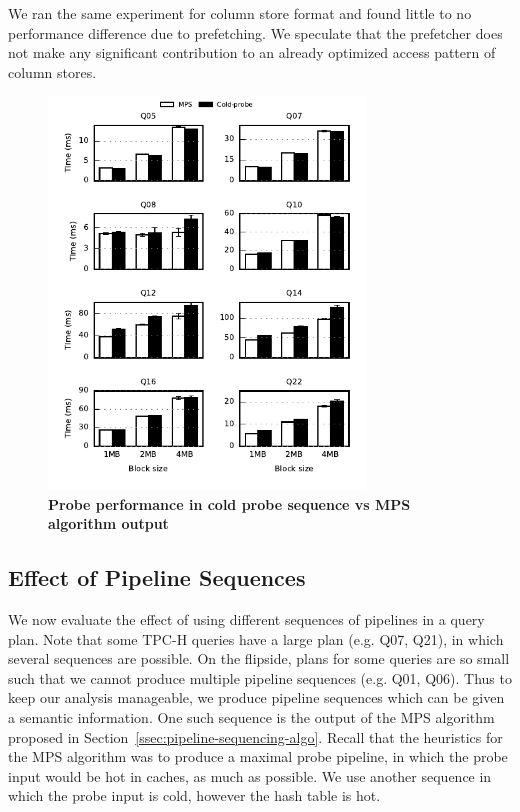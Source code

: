 We ran the same experiment for column store format and found little to no performance difference due to prefetching. 
We speculate that the prefetcher does not make any significant contribution to an already optimized access pattern of column stores.
\begin{figure}[tp]
	\centering 
	\includegraphics[width=0.75\textwidth]{pipeline/figures/first-probe-comparison-mps-vs-coldprobe-20threads-colstore-withlip}
	\caption{\textbf{Probe performance in cold probe sequence vs MPS algorithm output}}
	\label{fig:coldprobe-vs-mps}
\end{figure}

\subsection{Effect of Pipeline Sequences}
We now evaluate the effect of using different sequences of pipelines in a query plan. 
Note that some TPC-H queries have a large plan (e.g. Q07, Q21), in which several sequences are possible.
On the flipside, plans for some queries are so small such that we cannot produce multiple pipeline sequences (e.g. Q01, Q06).
Thus to keep our analysis manageable, we produce pipeline sequences which can be given a semantic information. 
One such sequence is the output of the MPS algorithm proposed in Section~\ref{ssec:pipeline-sequencing-algo}.
Recall that the heuristics for the MPS algorithm was to produce a maximal probe pipeline, in which the probe input would be hot in caches, as much as possible.
We use another sequence in which the probe input is cold, however the hash table is hot. 

